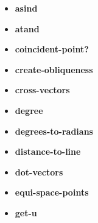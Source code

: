 \documentclass [11pt]{book}
\begin{document}
\begin{itemize}
\item {}
\label{prim:asind}
\textbf{asind}





\item {}
\label{prim:atand}
\textbf{atand}





\item {}
\label{prim:coincident-point?}
\textbf{coincident-point?}





\item {}
\label{prim:create-obliqueness}
\textbf{create-obliqueness}





\item {}
\label{prim:cross-vectors}
\textbf{cross-vectors}





\item {}
\label{prim:degree}
\textbf{degree}





\item {}
\label{prim:degrees-to-radians}
\textbf{degrees-to-radians}





\item {}
\label{prim:distance-to-line}
\textbf{distance-to-line}





\item {}
\label{prim:dot-vectors}
\textbf{dot-vectors}





\item {}
\label{prim:equi-space-points}
\textbf{equi-space-points}





\item {}
\label{prim:get-u}
\textbf{get-u}






\end{itemize}
\end{document}
